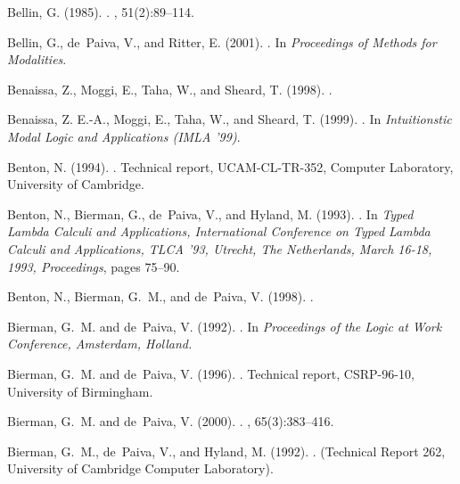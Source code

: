 \documentclass[a4paper]{amsart}
\begin{document}
\begin{thebibliography}{}
Bellin, G. (1985).
.
, 51(2):89--114.

Bellin, G., de~Paiva, V., and Ritter, E. (2001).
.
\newblock In {\em Proceedings of Methods for Modalities}.

Benaissa, Z., Moggi, E., Taha, W., and Sheard, T. (1998).
.

Benaissa, Z. E.-A., Moggi, E., Taha, W., and Sheard, T. (1999).
.
\newblock In {\em Intuitionstic Modal Logic and Applications (IMLA '99)}.

Benton, N. (1994).
.
\newblock Technical report, UCAM-CL-TR-352, Computer Laboratory, University of
  Cambridge.

Benton, N., Bierman, G., de~Paiva, V., and Hyland, M. (1993).
.
\newblock In {\em Typed Lambda Calculi and Applications, International
  Conference on Typed Lambda Calculi and Applications, TLCA '93, Utrecht, The
  Netherlands, March 16-18, 1993, Proceedings}, pages 75--90.

Benton, N., Bierman, G.~M., and de~Paiva, V. (1998).
.

Bierman, G.~M. and de~Paiva, V. (1992).
.
\newblock In {\em Proceedings of the Logic at Work Conference, Amsterdam,
  Holland.}

Bierman, G.~M. and de~Paiva, V. (1996).
.
\newblock Technical report, CSRP-96-10, University of Birmingham.

Bierman, G.~M. and de~Paiva, V. (2000).
.
, 65(3):383--416.

Bierman, G.~M., de~Paiva, V., and Hyland, M. (1992).
.
\newblock (Technical Report 262, University of Cambridge Computer Laboratory).


\end{thebibliography}
\end{document}
